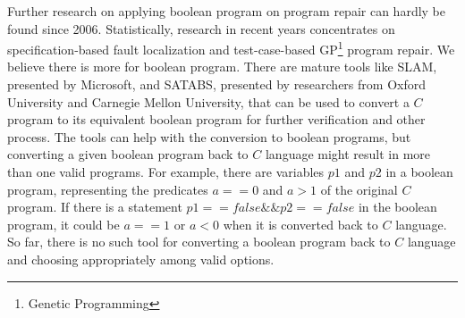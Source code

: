 \documentclass[10pt,journal,final,]{article}
\theoremstyle{definition}
\begin{document}
Further research on applying boolean program on program repair can hardly be found since 2006.
Statistically, research in recent years concentrates on specification-based fault localization and test-case-based GP\footnote{Genetic Programming} program repair.
We believe there is more for boolean program.
There are mature tools like SLAM\cite{SLAM}, presented by Microsoft, and SATABS\cite{SATABS}, presented by researchers from Oxford University and Carnegie Mellon University,
that can be used to convert a $C$ program to its equivalent boolean program for further verification and other process.
The tools can help with the conversion to boolean programs, but converting a given boolean program back to $C$ language might result in more than one valid programs.
For example, there are variables $p1$ and $p2$ in a boolean program, representing the predicates $a == 0$ and $a > 1$ of the original $C$ program. If there is a statement $p1 == false \&\& p2 == false$ in the boolean program,
it could be $a == 1$ or $a < 0$ when it is converted back to $C$ language.
So far, there is no such tool for converting a boolean program back to $C$ language and choosing appropriately among valid options.
\end{document}
